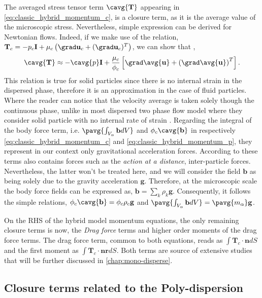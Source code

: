 The averaged stress tensor term $\cavg{\textbf{T}}$ appearing in \ref{eq:classic_hybrid_momentum_c}, is a closure term, as it is the average value of the microscopic stress. 
Nevertheless, simple expression can be derived for Newtonian flows. 
Indeed, if we make use of the relation, $\textbf{T}_c = -p_c\textbf{I} + \mu_c \left(\grad \textbf{u}_c+ (\grad \textbf{u}_c)^T\right)$, 
we can show that \citep{jackson2000dynamics}, 
\begin{equation*}
    \cavg{\textbf{T}} \approx - \cavg{p}\textbf{I} 
    + \frac{\mu_c}{\phi_c} \left[\grad \avg{\textbf{u}} + \left(\grad \avg{\textbf{u}}\right)^T\right].
\end{equation*}
This relation is true for solid particles since there is no internal strain in the dispersed phase, therefore it is an approximation in the case of fluid particles.  
Where the reader can notice that the velocity average is taken solely though the continuous phase, unlike in most dispersed two phase flow model where they consider solid particle with no internal rate of strain \citep{jackson1997locally}. 
Regarding the integral of the body force term, i.e. $\pavg{\int_{V_\alpha} \textbf{b} dV}$ and $\phi_c\cavg{\textbf{b}}$ in respectively \ref{eq:classic_hybrid_momentum_c} and \ref{eq:classic_hybrid_momentum_p}, they represent in our context only gravitational acceleration forces. 
According to \citet{nott2011suspension} these terms also contains forces such as the \textit{action at a distance}, inter-particle forces.
Nevertheless, the latter won't be treated here, and we will consider the field $\textbf{b}$ as being solely due to the gravity acceleration $\textbf{g}$. 
Therefore, at the microscopic scale the body force fields can be expressed as, $\textbf{b} = \sum_{k} \rho_k \textbf{g}$. 
Consequently, it follows the simple relations, $\phi_c\cavg{\textbf{b}} = \phi_c \rho_c \textbf{g}$ and $\pavg{\int_{V_\alpha} \textbf{b} dV} = \pavg{m_\alpha}\textbf{g}$.  


On the RHS of the hybrid model momentum equations, the only remaining closure terms is now, the \textit{Drag force} terms and higher order moments of the drag force terms. 
The drag force term, common to both equations, reads as $\int \textbf{T}_c \cdot \textbf{n} dS$ and the first moment as $ \int \textbf{T}_c \cdot \textbf{nr} dS$. 
Both terms are source of extensive studies that will be further discussed in \ref{chap:mono-disperse}.

\subsection{Closure terms related to the Poly-dispersion}


